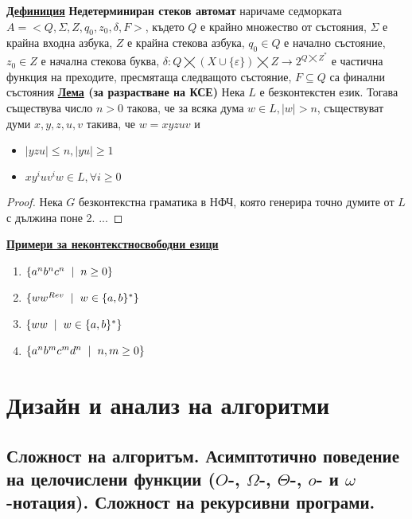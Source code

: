 \documentclass{article}
\begin{document}
\textbf{\underline{Дефиниция}}
\textbf{Недетерминиран стеков автомат} наричаме седморката $A = <Q, \Sigma, Z, q_0, z_0, \delta, F>$, където
$Q$ е крайно множество от състояния, $\Sigma$ е крайна входна азбука, $Z$ е крайна стекова азбука, $q_0 \in Q$ е начално състояние,
$z_0 \in Z$ е начална стекова буква, $\delta : Q \bigtimes (X \cup \{\varepsilon\}) \bigtimes Z \rightarrow 2^{Q \bigtimes Z^*}$
е частична функция на преходите, пресмятаща следващото състояние, $F \subseteq Q$ са финални състояния \newline\newline
\textbf{\underline{Лема} (за разрастване на КСЕ)} \newline
Нека $L$ е безконтекстен език. Тогава съществува число $n > 0$ такова, че за всяка дума $w \in L, |w| > n$, съществуват думи
$x, y, z, u, v$ такива, че $w = xyzuv$ и
\begin{itemize}
    \item $|yzu| \le n, |yu| \ge 1$
    \item $xy^iuv^iw \in L, \forall i \ge 0$
\end{itemize}
\begin{proof}
Нека $G$ безконтекстна граматика в НФЧ, която генерира точно думите от $L$ с дължина поне 2. ...
\end{proof}
\textbf{\underline{Примери за неконтекстносвободни езици}}
\begin{enumerate}
    \item $\{a^nb^nc^n \hspace{0.2cm} | \hspace{0.2cm} n \ge 0\}$
    \item $\{ww^{Rev} \hspace{0.2cm} | \hspace{0.2cm} w \in \{a, b\}^*\}$
    \item $\{ww \hspace{0.2cm} | \hspace{0.2cm} w \in \{a, b\}^*\}$
    \item $\{a^nb^mc^md^n \hspace{0.2cm} | \hspace{0.2cm} n, m \ge 0\}$
\end{enumerate}

\section*{Дизайн и анализ на алгоритми}

\subsection*{Сложност на алгоритъм. Асимптотично поведение на целочислени функции 
($O$-, $\Omega$-, $\Theta$-, $o$- и $\omega$-нотация). Сложност на рекурсивни програми.}
\end{document}
